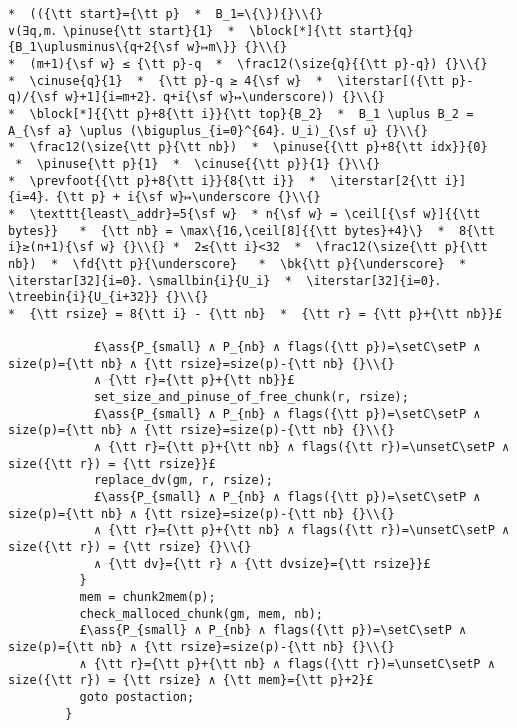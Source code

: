 \documentclass[10pt,a4paper,twoside]{report}
\makeatletter
\newcommand{\ml}[2][t]{\mbox{\mdseries\begin{tabular}[#1]{@{}L@{}}#2\end{tabular}}}
\newcommand{\ass}[1]{\ensuremath{{\color{blue}\left\{\ml[c]{#1}\right\}}}}
\renewcommand{\ceil}[2][]{\left\lceil{#2}\right\rceil_{#1}}
\newcommand{\setC}{\raisebox{1.5pt}{$\blacktriangledown$}}
\newcommand{\unsetC}{\raisebox{1.5pt}{$\triangledown$}}
\newcommand{\setP}{{\blacktriangle}}
\newcommand{\iterstar}[2][]{\text{\LARGE $*$}^{#1}_{#2}}
\makeatother
\begin{document}
\begin{lstlisting}
*  (({\tt start}={\tt p}  *  B_1=\{\}){}\\{}
∨(∃q,m．\pinuse{\tt start}{1}  *  \block[*]{\tt start}{q}{B_1\uplusminus\{q+2{\sf w}↦m\}} {}\\{}
*  (m+1){\sf w} ≤ {\tt p}-q  *  \frac12(\size{q}{{\tt p}-q}) {}\\{}
*  \cinuse{q}{1}  *  {\tt p}-q ≥ 4{\sf w}  *  \iterstar[({\tt p}-q)/{\sf w}+1]{i=m+2}．q+i{\sf w}↦\underscore)) {}\\{}
*  \block[*]{{\tt p}+8{\tt i}}{\tt top}{B_2}  *  B_1 \uplus B_2 = A_{\sf a} \uplus (\biguplus_{i=0}^{64}．U_i)_{\sf u} {}\\{}
*  \frac12(\size{\tt p}{\tt nb})  *  \pinuse{{\tt p}+8{\tt idx}}{0}  *  \pinuse{\tt p}{1}  *  \cinuse{{\tt p}}{1} {}\\{}
*  \prevfoot{{\tt p}+8{\tt i}}{8{\tt i}}  *  \iterstar[2{\tt i}]{i=4}．{\tt p} + i{\sf w}↦\underscore {}\\{}
*  \texttt{least\_addr}=5{\sf w}  * n{\sf w} = \ceil[{\sf w}]{{\tt bytes}}   *  {\tt nb} = \max\{16,\ceil[8]{{\tt bytes}+4}\}  *  8{\tt i}≥(n+1){\sf w} {}\\{} *  2≤{\tt i}<32  *  \frac12(\size{\tt p}{\tt nb})  *  \fd{\tt p}{\underscore}   *  \bk{\tt p}{\underscore}  *  \iterstar[32]{i=0}．\smallbin{i}{U_i}  *  \iterstar[32]{i=0}．\treebin{i}{U_{i+32}} {}\\{}
*  {\tt rsize} = 8{\tt i} - {\tt nb}  *  {\tt r} = {\tt p}+{\tt nb}}£

            £\ass{P_{small} ∧ P_{nb} ∧ flags({\tt p})=\setC\setP ∧ size(p)={\tt nb} ∧ {\tt rsize}=size(p)-{\tt nb} {}\\{}
            ∧ {\tt r}={\tt p}+{\tt nb}}£
            set_size_and_pinuse_of_free_chunk(r, rsize);
            £\ass{P_{small} ∧ P_{nb} ∧ flags({\tt p})=\setC\setP ∧ size(p)={\tt nb} ∧ {\tt rsize}=size(p)-{\tt nb} {}\\{} 
            ∧ {\tt r}={\tt p}+{\tt nb} ∧ flags({\tt r})=\unsetC\setP ∧ size({\tt r}) = {\tt rsize}}£
            replace_dv(gm, r, rsize);
            £\ass{P_{small} ∧ P_{nb} ∧ flags({\tt p})=\setC\setP ∧ size(p)={\tt nb} ∧ {\tt rsize}=size(p)-{\tt nb} {}\\{} 
            ∧ {\tt r}={\tt p}+{\tt nb} ∧ flags({\tt r})=\unsetC\setP ∧ size({\tt r}) = {\tt rsize} {}\\{}
            ∧ {\tt dv}={\tt r} ∧ {\tt dvsize}={\tt rsize}}£
          }
          mem = chunk2mem(p);
          check_malloced_chunk(gm, mem, nb);
          £\ass{P_{small} ∧ P_{nb} ∧ flags({\tt p})=\setC\setP ∧ size(p)={\tt nb} ∧ {\tt rsize}=size(p)-{\tt nb} {}\\{} 
          ∧ {\tt r}={\tt p}+{\tt nb} ∧ flags({\tt r})=\unsetC\setP ∧ size({\tt r}) = {\tt rsize} ∧ {\tt mem}={\tt p}+2}£
          goto postaction;
        }
\end{lstlisting}
\end{document}
